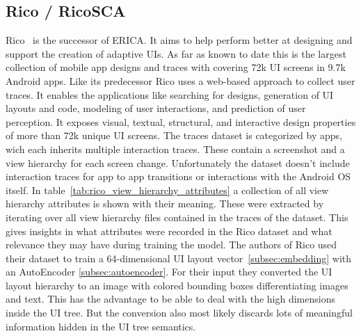 


\subsection{Rico / RicoSCA}
\label{subsec:rico}

Rico~\cite{deka2017rico} is the successor of ERICA.
It aims to help perform better at designing and support the creation of adaptive UIs.
As far as known to date this is the largest collection of mobile app designs and traces with covering 72k UI screens in 9.7k Android apps.
Like its predecessor Rico uses a web-based approach to collect user traces.
It enables the applications like searching for designs, generation of UI layouts and code, modeling of user interactions, and prediction of user perception.
It exposes visual, textual, structural, and interactive design properties of more than 72k unique UI screens.
The traces dataset is categorized by apps, wich each inherits multiple interaction traces.
These contain a screenshot and a view hierarchy for each screen change.
Unfortunately the dataset doesn't include interaction traces for app to app transitions or interactions with the Android OS itself.
In table~\ref{tab:rico_view_hierarchy_attributes} a collection of all view hierarchy attributes is shown with their meaning.
These were extracted by iterating over all view hierarchy files contained in the traces of the dataset.
This gives insights in what attributes were recorded in the Rico dataset and what relevance they may have during training the model.
The authors of Rico used their dataset to train a 64-dimensional UI layout vector~\ref{subsec:embedding} with an AutoEncoder \ref{subsec:autoencoder}.
For their input they converted the UI layout hierarchy to an image with colored bounding boxes differentiating images and text.
This has the advantage to be able to deal with the high dimensions inside the UI tree.
But the conversion also most likely discards lots of meaningful information hidden in the UI tree semantics.


